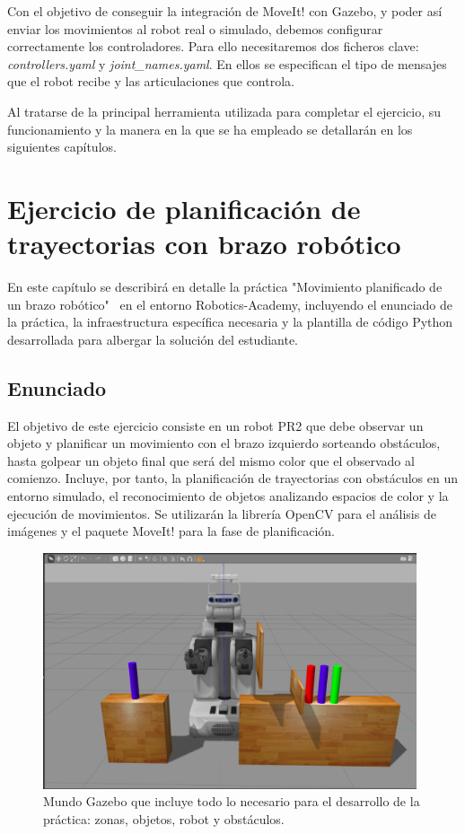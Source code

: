 \documentclass[12pt,spanish,chapterprefix, numbers=noenddot]{book}
\numberwithin{equation}{section}
\numberwithin{figure}{section}
\begin{document}
Con el objetivo de conseguir la integración de MoveIt! con Gazebo, y poder así enviar los movimientos al robot real o simulado, debemos configurar correctamente los controladores. Para ello necesitaremos dos ficheros clave: \textit{controllers.yaml} y \textit{joint\_names.yaml}.  En ellos se especifican el tipo de mensajes que el robot recibe y las articulaciones que controla.  

Al tratarse de la principal herramienta utilizada para completar el ejercicio, su funcionamiento y la manera en la que se ha empleado se detallarán en los siguientes capítulos.

\chapter{Ejercicio de planificación de trayectorias con brazo robótico}
En este capítulo se describirá en detalle la práctica "Movimiento planificado de un brazo robótico" \ en el entorno Robotics-Academy, incluyendo el enunciado de la práctica, la infraestructura específica necesaria y la plantilla de código Python desarrollada para albergar la solución del estudiante. 

\section{Enunciado}
 El objetivo de este ejercicio consiste en un robot PR2 que debe observar un objeto y planificar un movimiento con el brazo izquierdo sorteando obstáculos, hasta golpear un objeto final que será del mismo color que el observado al comienzo. Incluye, por tanto, la planificación de trayectorias con obstáculos en un entorno simulado, el reconocimiento de objetos analizando espacios de color y la ejecución de movimientos. Se utilizarán la librería OpenCV para el análisis de imágenes y el paquete MoveIt! para la fase de planificación. 

\begin{figure}[hbt!]
\centering
\includegraphics[width=11cm]{Figs/tfg_gazebo_world.png}
\par
\caption{\label{fig:Mundo-gazebo}Mundo Gazebo que incluye todo lo necesario para el desarrollo de la práctica: zonas, objetos, robot y obstáculos.}
\end{figure}
\end{document}

